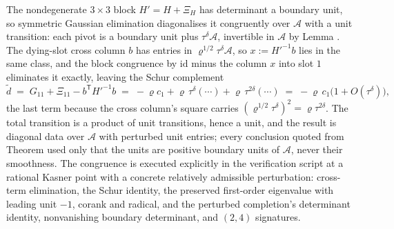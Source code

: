 The nondegenerate $3\times3$ block $H' = H + \Xi_H$ has determinant a boundary unit, so symmetric Gaussian elimination diagonalises it congruently over $\mathcal{A}$ with a unit transition: each pivot is a boundary unit plus $\tau^\delta\mathcal{A}$, invertible in $\mathcal{A}$ by Lemma . The dying-slot cross column $b$ has entries in $\varrho^{1/2}\tau^\delta\mathcal{A}$, so $x := H'^{-1}b$ lies in the same class, and the block congruence by $\mathrm{id}$ minus the column $x$ into slot $1$ eliminates it exactly, leaving the Schur complement
\[
\tilde d \;=\; G_{11} + \Xi_{11} - b^{\mathsf T}H'^{-1}b \;=\; -\varrho c_1 + \varrho\,\tau^\delta(\cdots) + \varrho\,\tau^{2\delta}(\cdots) \;=\; -\varrho\,c_1\bigl(1 + O(\tau^\delta)\bigr),
\]
the last term because the cross column's square carries $(\varrho^{1/2}\tau^\delta)^2 = \varrho\tau^{2\delta}$. The total transition is a product of unit transitions, hence a unit, and the result is diagonal data over $\mathcal{A}$ with perturbed unit entries; every conclusion quoted from Theorem  used only that the units are positive boundary units of $\mathcal{A}$, never their smoothness. The congruence is executed explicitly in the verification script at a rational Kasner point with a concrete relatively admissible perturbation: cross-term elimination, the Schur identity, the preserved first-order eigenvalue with leading unit $-1$, corank and radical, and the perturbed completion's determinant identity, nonvanishing boundary determinant, and $(2,4)$ signatures.
